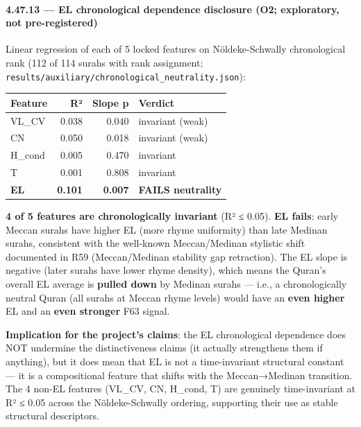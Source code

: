 \documentclass[
]{article}
\newcounter{none} %
\begin{document}
\paragraph{4.47.13 --- EL chronological dependence disclosure (O2;
exploratory, not
pre-registered)}\label{el-chronological-dependence-disclosure-o2-exploratory-not-pre-registered}

Linear regression of each of 5 locked features on Nöldeke-Schwally
chronological rank (112 of 114 surahs with rank assignment;
\texttt{results/auxiliary/chronological\_neutrality.json}):

{\def\LTcaptype{none} %
\begin{longtable}[]{@{}lrrl@{}}
\toprule\noalign{}
Feature & R² & Slope p & Verdict \\
\midrule\noalign{}
\endhead
\bottomrule\noalign{}
\endlastfoot
VL\_CV & 0.038 & 0.040 & invariant (weak) \\
CN & 0.050 & 0.018 & invariant (weak) \\
H\_cond & 0.005 & 0.470 & invariant \\
T & 0.001 & 0.808 & invariant \\
\textbf{EL} & \textbf{0.101} & \textbf{0.007} & \textbf{FAILS
neutrality} \\
\end{longtable}
}

\textbf{4 of 5 features are chronologically invariant} (R² ≤ 0.05).
\textbf{EL fails}: early Meccan surahs have higher EL (more rhyme
uniformity) than late Medinan surahs, consistent with the well-known
Meccan/Medinan stylistic shift documented in R59 (Meccan/Medinan
stability gap retraction). The EL slope is negative (later surahs have
lower rhyme density), which means the Quran's overall EL average is
\textbf{pulled down} by Medinan surahs --- i.e., a chronologically
neutral Quran (all surahs at Meccan rhyme levels) would have an
\textbf{even higher} EL and an \textbf{even stronger} F63 signal.

\textbf{Implication for the project's claims}: the EL chronological
dependence does NOT undermine the distinctiveness claims (it actually
strengthens them if anything), but it does mean that EL is not a
time-invariant structural constant --- it is a compositional feature
that shifts with the Meccan→Medinan transition. The 4 non-EL features
(VL\_CV, CN, H\_cond, T) are genuinely time-invariant at R² ≤ 0.05
across the Nöldeke-Schwally ordering, supporting their use as stable
structural descriptors.
\end{document}
